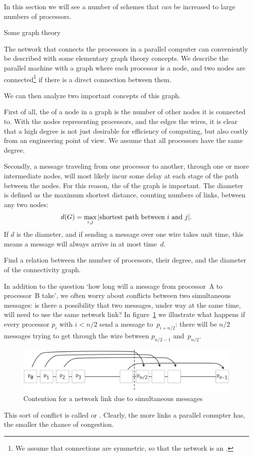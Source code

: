In this section we will see a number of schemes that \emph{can} be
increased to large numbers of processors.

 {Some graph theory}

The network that connects the processors in a parallel computer can
conveniently be described with some elementary graph theory
concepts. We describe the parallel machine with a graph where each
processor is a node, and two nodes are connected\footnote{We assume
  that connections are symmetric, so that the network
  is an .} if
there is a direct connection between them. 

We can then analyze two
important concepts of this graph.

First of all, the  of a node in a graph is the
number of other nodes it is connected to. With the nodes representing
processors, and the edges the wires, it is clear that a high degree
is not just desirable for efficiency of computing, but also costly
from an engineering point of view. We assume that all processors have
the same degree.

Secondly, a message traveling from one processor to another, through
one or more intermediate nodes, will most likely incur some delay at each
stage of the path between the nodes.
For this reason, the  of the
graph is important. The diameter is defined as the maximum shortest
distance, counting numbers of links, between any two nodes:
\[ d(G) = \max_{i,j}|\hbox{shortest path between $i$ and $j$}|. \]
If $d$ is the diameter,
and if sending a message over one wire takes unit time,
this means a message will always arrive in at most time~$d$.

\begin{exercise}
  Find a relation between the number of processors, their degree,
  and the diameter of the connectivity graph.
\end{exercise}

In addition to the question `how long will a message from processor~A
to processor~B take', we often worry about conflicts between two
simultaneous messages: is there a possibility that two messages, under
way at the same time, will need to use the same network link? In
figure~\ref{fig:contention} we illustrate what happens if every
processor $p_i$ with $i<n/2$ send a message to~$p_{i+n/2}$: there will
be $n/2$ messages trying to get through the wire between $p_{n/2-1}$
and~$p_{n/2}$.
\begin{figure}[ht]
  \includegraphics[scale=.09]{graphics-public/contention}
  \caption{Contention for a network link due to simultaneous messages}
  \label{fig:contention}
\end{figure}
This
sort of conflict is called  or
. Clearly, the more links a
parallel comupter has, the smaller the chance of congestion.

